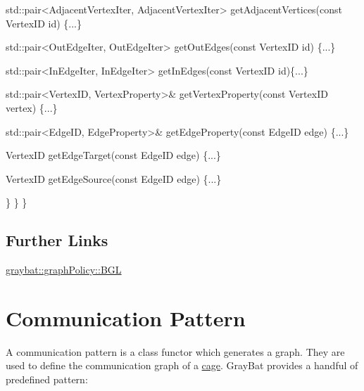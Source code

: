 \begin{DoxyCode}
                        std::pair<AdjacentVertexIter, AdjacentVertexIter> getAdjacentVertices(\textcolor{keyword}{const} 
      VertexID \textcolor{keywordtype}{id}) \{...\}

                        std::pair<OutEdgeIter, OutEdgeIter> getOutEdges(\textcolor{keyword}{const} VertexID \textcolor{keywordtype}{id}) \{...\}

                        std::pair<InEdgeIter, InEdgeIter> getInEdges(\textcolor{keyword}{const} VertexID \textcolor{keywordtype}{id})\{...\}

                        std::pair<VertexID, VertexProperty>& getVertexProperty(\textcolor{keyword}{const} VertexID vertex) \{...\}

                        std::pair<EdgeID, EdgeProperty>& getEdgeProperty(\textcolor{keyword}{const} EdgeID edge) \{...\}

                        VertexID getEdgeTarget(\textcolor{keyword}{const} EdgeID edge) \{...\}

                        VertexID getEdgeSource(\textcolor{keyword}{const} EdgeID edge) \{...\}

                \}
        \}
\}
\end{DoxyCode}


\subsection*{Further Links}


\begin{DoxyItemize}
\item \hyperlink{classgraybat_1_1graphPolicy_1_1BGL}{graybat\+::graph\+Policy\+::\+B\+G\+L} 
\end{DoxyItemize}\hypertarget{communicationPattern}{}\section{Communication Pattern}\label{communicationPattern}
A communication pattern is a class functor which generates a graph. They are used to define the communication graph of a \hyperlink{cage}{cage}. Gray\+Bat provides a handful of predefined pattern\+:


